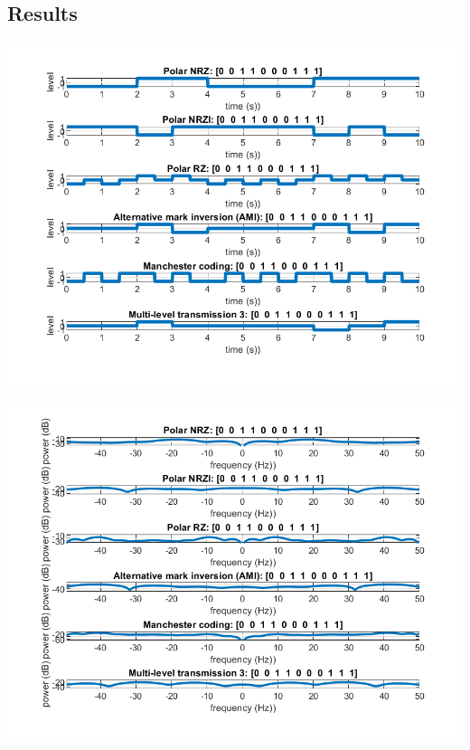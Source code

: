 \documentclass[a4paper, 12pt, english]{article}
\newenvironment{Figure}
  {\par\medskip\noindent\minipage{\linewidth}}
  {\endminipage\par\medskip}
\begin{document}
\subsection{Results}
\begin{Figure}
 \centering
 \includegraphics[width=\linewidth, scale=0.5]{figures/line-code/line-codes.png}
\end{Figure}
\begin{Figure}
 \centering
 \includegraphics[width=\linewidth, scale=0.5]{figures/line-code/psd.png}
\end{Figure}


\end{document}
